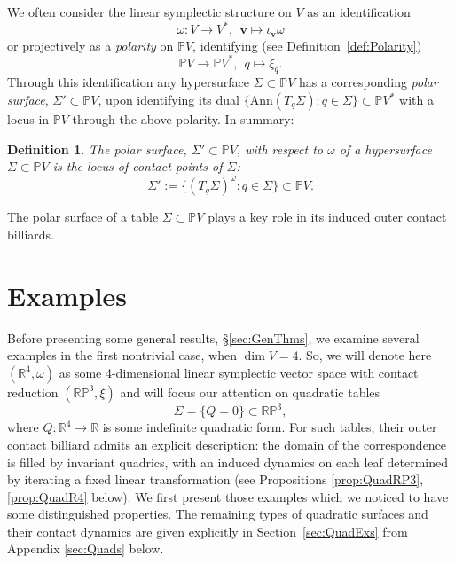 \documentclass{article}
\newcommand{\R}{\mathbb{R}} %
\newtheorem{defi}{Definition}[section]
\begin{document}
We often consider the linear symplectic structure on $V$ as an identification
\[ \omega:V \to V^*, ~~\boldsymbol{v}\mapsto \iota_{\boldsymbol{ v}}\omega \]
or projectively as a {\em polarity} on $\mathbb{P}V$, identifying (see Definition~\ref{def:Polarity})
\[ \mathbb{P}V \to \mathbb{P}V^*, ~~q\mapsto \xi_q. \]
Through this identification any hypersurface $\Sigma\subset\mathbb{P}V$ has a corresponding {\em polar surface}, $\Sigma'\subset \mathbb{P}V$,  upon identifying its dual $\{ \text{Ann}( T_q\Sigma ): q\in\Sigma\} \subset\mathbb{P}V^*$ with a locus in $\mathbb{P}V$ through the above polarity. In summary:
\begin{defi}\label{def:PolSurf}
    The {\em polar surface}, $\Sigma'\subset\mathbb{P}V$, with respect to $\omega$ of a hypersurface $\Sigma\subset \mathbb{P}V$ is the locus of contact points of $\Sigma$:
    \[ \Sigma' := \{ (T_q\Sigma)^\omega: q\in \Sigma\} \subset \mathbb{P}V. \]
\end{defi}

The polar surface of a table $\Sigma\subset\mathbb{P}V$ plays a key role in its induced 
outer contact billiards.


\section{Examples}\label{sec:Exs}

Before presenting some general results, \S \ref{sec:GenThms}, we examine several examples 
in the first nontrivial case, when $\dim V = 4$. So, we will denote here $(\R^4,\omega)$ 
as some 4-dimensional linear symplectic vector space with contact reduction
$(\mathbb{RP}^3,\xi)$ and will focus our attention on quadratic tables
\[ \Sigma=\{Q=0\}\subset\mathbb{RP}^3,\]
where $Q:\R^4\to\R$ is some indefinite quadratic form. For such tables, their outer contact
billiard admits an explicit description: the domain of the correspondence is filled by 
invariant quadrics, with an induced dynamics on each leaf determined by iterating a fixed 
linear transformation (see Propositions \ref{prop:QuadRP3}, \ref{prop:QuadR4} below). We 
first present those examples which we noticed to have some distinguished properties. The 
remaining types of quadratic surfaces and their contact dynamics are given explicitly in 
Section~\ref{sec:QuadExs} from Appendix \ref{sec:Quads} below. \\
\end{document}
